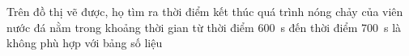 \begin{ex}
	{Trên đồ thị vẽ được, họ tìm ra thời điểm kết thúc quá trình nóng chảy của viên nước đá nằm trong khoảng thời gian từ thời điểm \SI{600}{\second} đến thời điểm \SI{700}{\second} là không phù hợp với bảng số liệu}
\end{ex}
